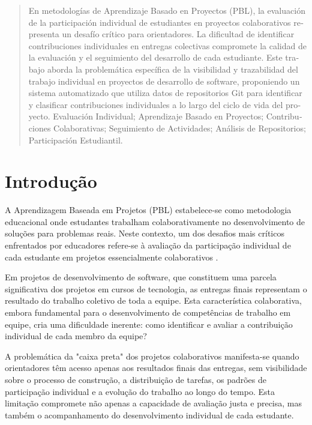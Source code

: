 \documentclass[english, spanish, brazilian]{RBIEarticle} %
\begin{document}
\begin{otherlanguage}{spanish}
\begin{abstract}
En metodologías de Aprendizaje Basado en Proyectos (PBL), la evaluación de la participación individual de estudiantes en proyectos colaborativos representa un desafío crítico para orientadores. La dificultad de identificar contribuciones individuales en entregas colectivas compromete la calidad de la evaluación y el seguimiento del desarrollo de cada estudiante. Este trabajo aborda la problemática específica de la visibilidad y trazabilidad del trabajo individual en proyectos de desarrollo de software, proponiendo un sistema automatizado que utiliza datos de repositorios Git para identificar y clasificar contribuciones individuales a lo largo del ciclo de vida del proyecto.
\keywords Evaluación Individual; Aprendizaje Basado en Proyectos; Contribuciones Colaborativas; Seguimiento de Actividades; Análisis de Repositorios; Participación Estudiantil.
\end{abstract}
\end{otherlanguage}

\pagebreak


\section{Introdução}

A Aprendizagem Baseada em Projetos (PBL) estabelece-se como metodologia educacional onde estudantes trabalham colaborativamente no desenvolvimento de soluções para problemas reais. Neste contexto, um dos desafios mais críticos enfrentados por educadores refere-se à avaliação da participação individual de cada estudante em projetos essencialmente colaborativos \cite{Baker2011}.

Em projetos de desenvolvimento de software, que constituem uma parcela significativa dos projetos em cursos de tecnologia, as entregas finais representam o resultado do trabalho coletivo de toda a equipe. Esta característica colaborativa, embora fundamental para o desenvolvimento de competências de trabalho em equipe, cria uma dificuldade inerente: como identificar e avaliar a contribuição individual de cada membro da equipe?

A problemática da "caixa preta" dos projetos colaborativos manifesta-se quando orientadores têm acesso apenas aos resultados finais das entregas, sem visibilidade sobre o processo de construção, a distribuição de tarefas, os padrões de participação individual e a evolução do trabalho ao longo do tempo. Esta limitação compromete não apenas a capacidade de avaliação justa e precisa, mas também o acompanhamento do desenvolvimento individual de cada estudante.
\end{document}
